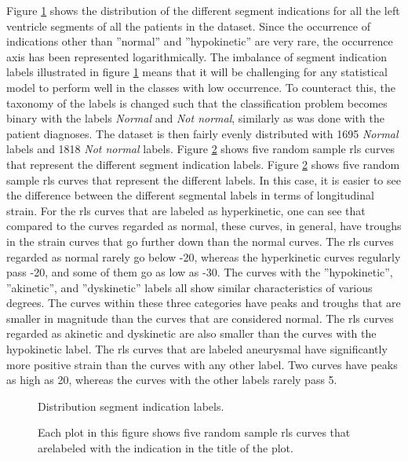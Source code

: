 Figure \ref{fig:segm_label_dist} shows the distribution of the different segment indications for all the left ventricle segments of all the patients in the dataset. Since the occurrence of indications other than ''normal'' and ''hypokinetic'' are very rare, the occurrence axis has been represented logarithmically. The imbalance of segment indication labels illustrated in figure \ref{fig:segm_label_dist} means that it will be challenging for any statistical model to perform well in the classes with low occurrence. To counteract this, the taxonomy of the labels is changed such that the classification problem becomes binary with the labels \textit{Normal} and \textit{Not normal}, similarly as was done with the patient diagnoses. The dataset is then fairly evenly distributed with 1695 \textit{Normal} labels and 1818 \textit{Not normal} labels. Figure \ref{fig:rls_curves_vs_segm_labels} shows five random sample \acrshort{rls} curves that represent the different segment indication labels. Figure \ref{fig:rls_curves_vs_segm_labels} shows five random sample \acrshort{rls} curves that represent the different labels. In this case, it is easier to see the difference between the different segmental labels in terms of longitudinal strain. For the \acrshort{rls} curves that are labeled as hyperkinetic, one can see that compared to the curves regarded as normal, these curves, in general, have troughs in the strain curves that go further down than the normal curves. The \acrshort{rls} curves regarded as normal rarely go below -20, whereas the hyperkinetic curves regularly pass -20, and some of them go as low as -30. The curves with the ''hypokinetic'', ''akinetic'', and ''dyskinetic'' labels all show similar characteristics of various degrees. The curves within these three categories have peaks and troughs that are smaller in magnitude than the curves that are considered normal. The \acrshort{rls} curves regarded as akinetic and dyskinetic are also smaller than the curves with the hypokinetic label. The \acrshort{rls} curves that are labeled aneurysmal have significantly more positive strain than the curves with any other label. Two curves have peaks as high as 20, whereas the curves with the other labels rarely pass 5.

\begin{figure}
    \centering
    
    \caption{Distribution segment indication labels.}
    \label{fig:segm_label_dist}
\end{figure}

\begin{figure}
    \centering
    
    \caption{Each plot in this figure shows five random sample \acrshort{rls} curves that arelabeled with the indication in the title of the plot.}
    \label{fig:rls_curves_vs_segm_labels}
\end{figure}